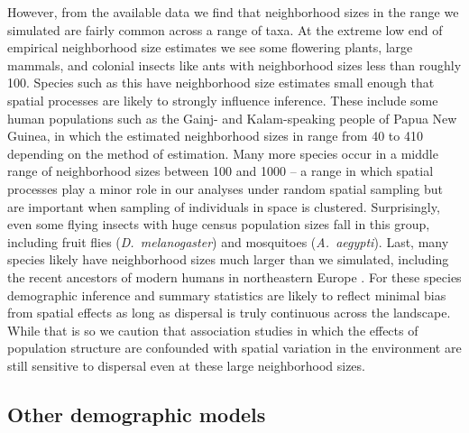 \documentclass[10pt,twoside,lineno,hidelinks]{preprint}
\begin{document}
However, from the available data we find that neighborhood sizes in the range we simulated are fairly common across a range of taxa. At the extreme low end of empirical neighborhood size estimates we see some flowering plants, large mammals, and colonial insects like ants with neighborhood sizes less than roughly 100. Species such as this have neighborhood size estimates small enough that spatial processes are likely to strongly influence inference.
These include some human populations such as the Gainj- and Kalam-speaking people of Papua New Guinea, in which the estimated neighborhood sizes in \citet{Rousset1997} range from 40 to 410 depending on the method of estimation. 
Many more species occur in a middle range of neighborhood sizes between 100 and 1000 -- a range in which spatial processes play a minor role in our analyses under random spatial sampling but are important when sampling of individuals in space is clustered. Surprisingly, even some flying insects with huge census population sizes fall in this group, including fruit flies (\textit{D.~melanogaster}) and mosquitoes (\textit{A.~aegypti}). Last, many species likely have neighborhood sizes much larger than we simulated, including the recent ancestors of modern humans in northeastern Europe \citep{Ringbauer2017}. For these species demographic inference and summary statistics are likely to reflect minimal bias from spatial effects as long as dispersal is truly continuous across the landscape. While that is so we caution that association studies in which the effects of population structure are confounded with spatial variation in the environment are still sensitive to dispersal even at these large neighborhood sizes.


\subsection{Other demographic models}
\end{document}
